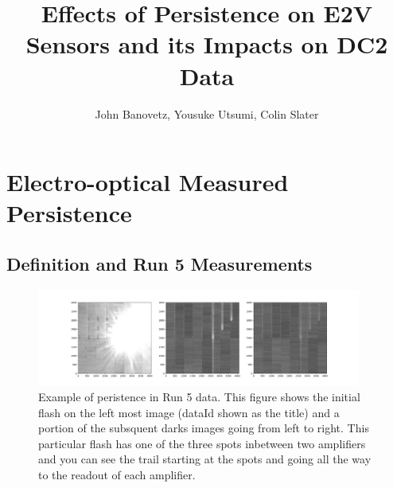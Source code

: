 \documentclass[DM,authoryear,toc]{lsstdoc}
\title{Effects of Persistence on E2V Sensors and its Impacts on DC2 Data}
\author{%
John Banovetz,
Yousuke Utsumi,
Colin Slater
}
\date{\vcsDate}
\begin{document}
\maketitle


\section{Electro-optical Measured Persistence}

\subsection{Definition and Run 5 Measurements}

\begin{figure}[!htp]
  \centering
  \includegraphics[width=0.95\textwidth, angle=0]{Run_5_persistence_ex_2.png}
  \caption{
  Example of peristence in Run 5 data. 
  This figure shows the initial flash on the left most image (dataId shown as the title) and a portion of the subsquent darks images going from left to right.
  This particular flash has one of the three spots inbetween two amplifiers and you can see the trail starting at the spots and going all the way to the readout of each amplifier.
  }\label{fig:ex_persistence_Run5}
\end{figure}
\end{document}
